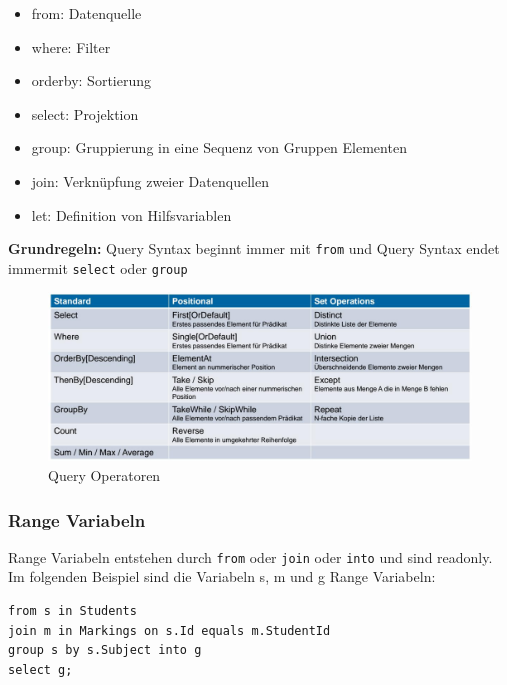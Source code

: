 \documentclass[
a4paper,
oneside,
10pt,
fleqn,
headsepline,
toc=listofnumbered, 
bibliography=totocnumbered]{scrartcl}
\begin{document}
\begin{itemize}
	\item from: Datenquelle
	\item where: Filter
	\item orderby: Sortierung
	\item select: Projektion
	\item group:  Gruppierung in eine Sequenz von Gruppen Elementen
	\item join: Verknüpfung zweier Datenquellen
	\item let: Definition von Hilfsvariablen
\end{itemize}
\textbf{Grundregeln:} Query Syntax beginnt immer mit \lstinline|from| und Query Syntax endet immermit \lstinline|select| oder \lstinline|group|
\begin{figure}[ht]
	\centering
	\includegraphics[width=\linewidth]{images/linq_query_operatoren}
	\caption{Query Operatoren}
	\label{fig:linqqueryoperatoren}
\end{figure}

\newpage

\subsubsection{Range Variabeln}
Range Variabeln entstehen durch \lstinline|from| oder \lstinline|join| oder \lstinline|into| und sind readonly.
Im folgenden Beispiel sind die Variabeln s, m und g Range Variabeln:
\begin{lstlisting}
from s in Students
join m in Markings on s.Id equals m.StudentId
group s by s.Subject into g 
select g; 
\end{lstlisting}
\end{document}
